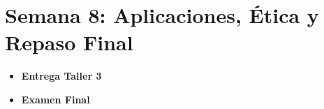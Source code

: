 \chapter{Semana 8: Aplicaciones, Ética y Repaso Final}

\begin{alertbox}[title=Eventos esta semana]
\begin{itemize}
    \item \textbf{Entrega Taller 3}
    \item \textbf{Examen Final}
\end{itemize}
\end{alertbox}




